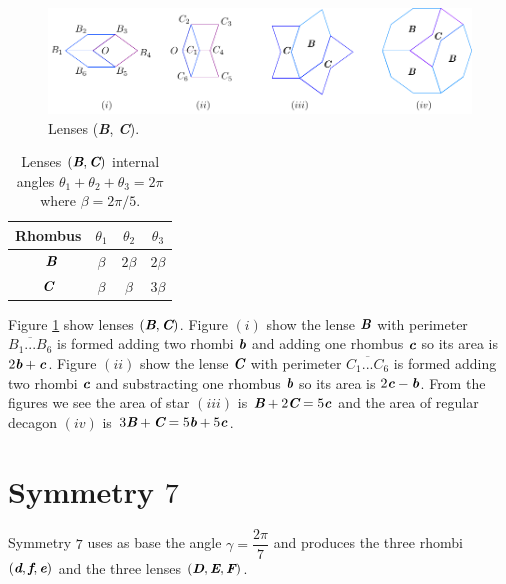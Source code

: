 \documentclass[11pt]{article}
\def\mathbi#1{\textbf{\em #1}}
\begin{document}
\begin{figure}[H]
\centering
\includegraphics[scale=1.1]{bc/hexagons}
\caption{Lenses (\mathbi{B}, \mathbi{C}).}
\label{fig:bc-hexagons}
\end{figure}

\begin{table}[H]
\begin{center}
\begin{tabular}{|c|c c c|}
\hline
Rhombus & $\theta_1$ & $\theta_2$ & $\theta_3$ \\ %
\hline\
$\mathbi{B}$ & $\beta$ & $2\beta$ & $2\beta$ \\[0.5ex] \hline
$\mathbi{C}$ & $\beta$ & $\beta$ & $3\beta$ \\[0.5ex] \hline
\end{tabular}
\caption{Lenses $(\mathbi{B},\mathbi{C})$ internal angles $\theta_1+\theta_2+\theta_3 = 2\pi$ where $\beta = 2\pi/5$.} 
\label{tbl:bc-lenses-angles}
\end{center}
\end{table}


Figure \ref{fig:bc-hexagons} show lenses $(\mathbi{B},\mathbi{C})$.
Figure $(i)$ show the lense $\mathbi{B}$ with perimeter $\overline{B_1...B_6}$ is formed adding two rhombi $\mathbi{b}$ and adding one rhombus $\mathbi{c}$ so its area is $2\mathbi{b} + \mathbi{c}$.
Figure $(ii)$ show the lense $\mathbi{C}$ with perimeter $\overline{C_1...C_6}$ is formed adding two rhombi $\mathbi{c}$ and substracting one rhombus $\mathbi{b}$ so its area is $2\mathbi{c} - \mathbi{b}$.
From the figures we see the area of star $(iii)$ is $\mathbi{B} + 2\mathbi{C} = 5\mathbi{c}$
and the area of regular decagon $(iv)$ is $3\mathbi{B} + \mathbi{C} = 5\mathbi{b} + 5\mathbi{c}$.

\section{Symmetry $7$}

Symmetry $7$ uses as base the angle $\gamma = \dfrac{2\pi}7$ and produces the three rhombi $(\mathbi{d},\mathbi{f},\mathbi{e})$ and the three lenses $(\mathbi{D},\mathbi{E},\mathbi{F})$.
\end{document}
